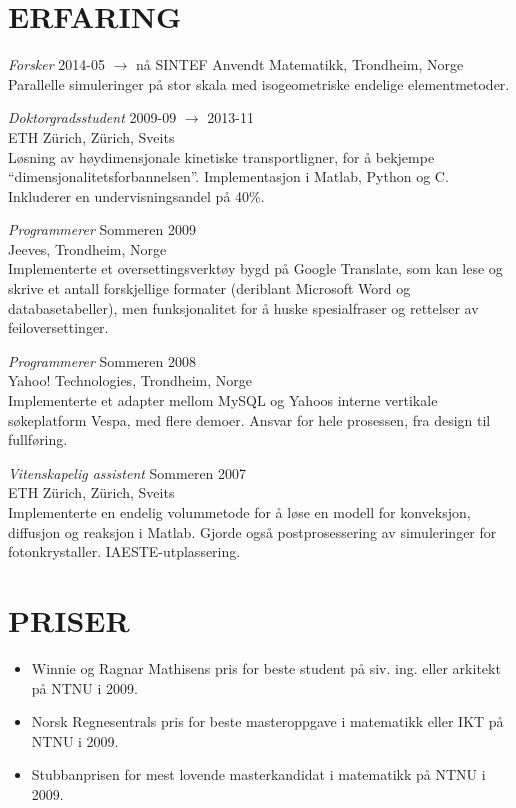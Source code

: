 \documentclass[line,margin]{res}
\newcommand{\zh}{Z\"{u}rich}
\begin{document}
\begin{resume}
\section{ERFARING} 

{\em Forsker} \hfill 2014-05 $\to$ nå
SINTEF Anvendt Matematikk, Trondheim, Norge
Parallelle simuleringer på stor skala med isogeometriske endelige elementmetoder.

{\em Doktorgradsstudent} \hfill 2009-09 $\to$ 2013-11 \\
ETH \zh, \zh, Sveits \\
Løsning av høydimensjonale kinetiske transportligner, for å bekjempe
``dimensjonalitetsforbannelsen''. Implementasjon i Matlab, Python og C.  Inkluderer en
undervisningsandel på 40\%.

{\em Programmerer} \hfill Sommeren 2009 \\
Jeeves, Trondheim, Norge \\
Implementerte et over\-settings\-verktøy bygd på Google Translate, som kan lese og skrive et antall
forskjellige formater (deriblant Microsoft Word og databasetabeller), men funksjonalitet for å huske
spesialfraser og rettelser av feil\-over\-settinger.

{\em Programmerer} \hfill Sommeren 2008 \\
Yahoo! Technologies, Trondheim, Norge \\
Implementerte et adapter mellom MySQL og Yahoos interne vertikale søke\-plat\-form Vespa, med flere
demoer. Ansvar for hele prosessen, fra design til fullføring.

{\em Vitenskapelig assistent} \hfill Sommeren 2007 \\
ETH \zh, \zh, Sveits \\
Implementerte en endelig volum\-metode for å løse en modell for konveksjon, diffusjon og reaksjon i
Matlab. Gjorde også post\-prosessering av simu\-leringer for
foton\-krystaller. IAESTE-utplas\-sering.

\newpage

\section{PRISER}

\begin{itemize}
\item Winnie og Ragnar Mathisens pris for beste student på siv. ing.  eller arkitekt på NTNU i 2009.
\item Norsk Regnesentrals pris for beste masteroppgave i matematikk eller IKT på NTNU i 2009.
\item Stubbanprisen for mest lovende masterkandidat i matematikk på NTNU i 2009.
\end{itemize}



\end{resume}
\end{document}
